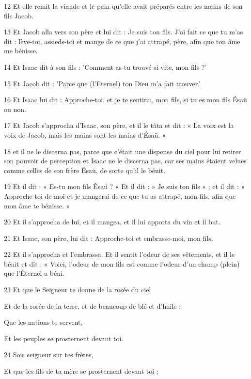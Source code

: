 \par 12 Et elle remit la viande et le pain qu'elle avait préparés entre les mains de son fils Jacob.
\par 13 Et Jacob alla vers son père et lui dit : Je suis ton fils. J'ai fait ce que tu m'as dit : lève-toi, assieds-toi et mange de ce que j'ai attrapé, père, afin que ton âme me bénisse.
\par 14 Et Isaac dit à son fils : 'Comment as-tu trouvé si vite, mon fils ?'
\par 15 Et Jacob dit : 'Parce que (l'Eternel) ton Dieu m'a fait trouver.'
\par 16 Et Isaac lui dit : Approche-toi, et je te sentirai, mon fils, si tu es mon fils Ésaü ou non.
\par 17 Et Jacob s'approcha d'Isaac, son père, et il le tâta et dit : « La voix est la voix de Jacob, mais les mains sont les mains d'Ésaü. »
\par 18 et il ne le discerna pas, parce que c'était une dispense du ciel pour lui retirer son pouvoir de perception et Isaac ne le discerna pas, car ses mains étaient velues comme celles de son frère Ésaü, de sorte qu'il le bénit.
\par 19 Et il dit : « Es-tu mon fils Ésaü ? « Et il dit : » Je suis ton fils « ; et il dit : » Approche-toi de moi et je mangerai de ce que tu as attrapé, mon fils, afin que mon âme te bénisse. »
\par 20 Et il s'approcha de lui, et il mangea, et il lui apporta du vin et il but.
\par 21 Et Isaac, son père, lui dit : Approche-toi et embrasse-moi, mon fils.
\par 22 Et il s'approcha et l'embrassa. Et il sentit l'odeur de ses vêtements, et il le bénit et dit : « Voici, l'odeur de mon fils est comme l'odeur d'un champ (plein) que l'Éternel a béni.
\par    
\par 23 Et que le Seigneur te donne de la rosée du ciel  
\par     Et de la rosée de la terre, et de beaucoup de blé et d'huile :
\par    
\par     Que les nations te servent,  
\par     Et les peuples se prosternent devant toi.
\par    
\par 24 Sois seigneur sur tes frères,  
\par     Et que les fils de ta mère se prosternent devant toi ;
